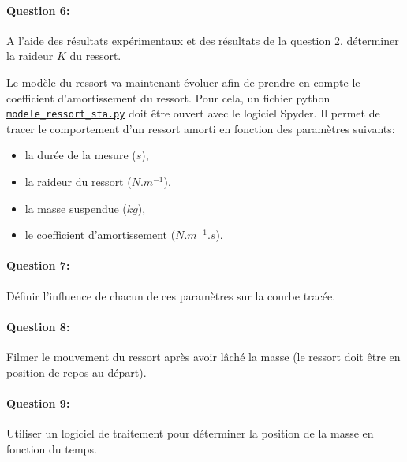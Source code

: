 
\paragraph{Question 6:} A l'aide des résultats expérimentaux et des résultats de la question 2, déterminer la raideur $K$ du ressort.


Le modèle du ressort va maintenant évoluer afin de prendre en compte le coefficient d'amortissement du ressort. Pour cela, un fichier python  
\href{https://github.com/Costadoat/Sciences-Ingenieur/raw/master/S01\%20Analyse\%20fonctionnelle/TP01\%20Mesures\%20physiques/Ilot_03\%20Ressort/modele_ressort_sta.py}{\texttt{modele\_ressort\_sta.py}} doit être ouvert avec le logiciel Spyder. Il permet de tracer le comportement d'un ressort amorti en fonction des paramètres suivants:
\begin{itemize}
 \item la durée de la mesure ($s$),
 \item la raideur du ressort ($N.m^{-1}$),
 \item la masse suspendue ($kg$),
 \item le coefficient d'amortissement ($N.m^{-1}.s$).
\end{itemize}

\paragraph{Question 7:} Définir l'influence de chacun de ces paramètres sur la courbe tracée.


\paragraph{Question 8:} Filmer le mouvement du ressort après avoir lâché la masse (le ressort doit être en position de repos au départ).

\paragraph{Question 9:} Utiliser un logiciel de traitement pour déterminer la position de la masse en fonction du temps.


